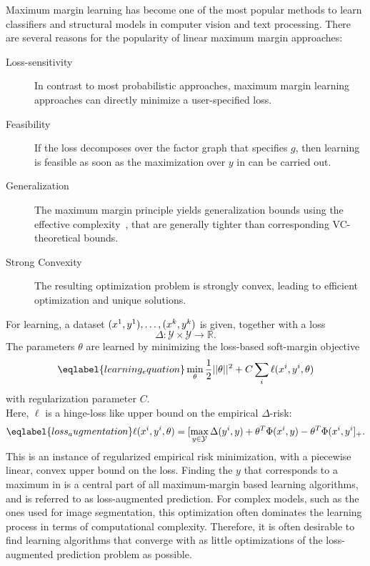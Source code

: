 Maximum margin learning has become one of the most popular methods to learn
classifiers and structural models in computer vision and text processing.
There are several reasons for the popularity of linear maximum margin approaches:
\begin{description}
    \item[Loss-sensitivity] In contrast to most probabilistic approaches, maximum margin learning approaches can directly
        minimize a user-specified loss.
    \item[Feasibility] If the loss decomposes over the factor graph that
        specifies $g$, then learning is feasible as soon as the maximization
        over $y$ in  can be carried out.
    \item[Generalization] The maximum margin principle yields generalization
        bounds using the effective complexity~\citep{taskar2003max}, that are generally
        tighter than corresponding VC-theoretical bounds.
    \item[Strong Convexity] The resulting optimization problem is strongly
        convex, leading to efficient optimization and unique solutions.
\end{description}

For learning, a dataset $(x^{1}, y^{1}),\dotsc,(x^{k}, y^{k})$ is given, together with a loss
\begin{equation}
    \Delta \colon \mathcal{Y} \times \mathcal{Y} \rightarrow \mathbb{R}.
\end{equation}
The parameters $\theta$ are learned by minimizing the loss-based soft-margin
objective
\begin{equation}\eqlabel{learning_equation}
    \min_\theta \frac{1}{2} ||\theta||^2 + C \sum_i  \ell(x\hoch{i}, y\hoch{i}, \theta)
\end{equation}
with regularization parameter $C$.\pagebreak\\
Here, $\ell$ is a hinge-loss like upper bound
on the empirical $\Delta$-risk:
\begin{equation}\eqlabel{loss_augmentation}
    \ell(x\hoch{i}, y\hoch{i}, \theta) = [\max_{y \in \mathcal{Y}} \Delta(y\hoch{i}, y) + \theta^T \Phi(x\hoch{i}, y) - \theta^T \Phi(x\hoch{i}, y\hoch{i}]_+.
\end{equation}
This is an instance of regularized empirical risk minimization, with a
piecewise linear, convex upper bound on the loss. 
Finding the $y$ that corresponds to a maximum in  is
a central part of all maximum-margin based learning algorithms, and is referred to
as loss-augmented prediction. For complex models, such as the ones used for
image segmentation, this optimization often dominates the learning process in
terms of computational complexity.
Therefore, it is often desirable to find learning algorithms that converge with
as little optimizations of the loss-augmented prediction problem as possible.

